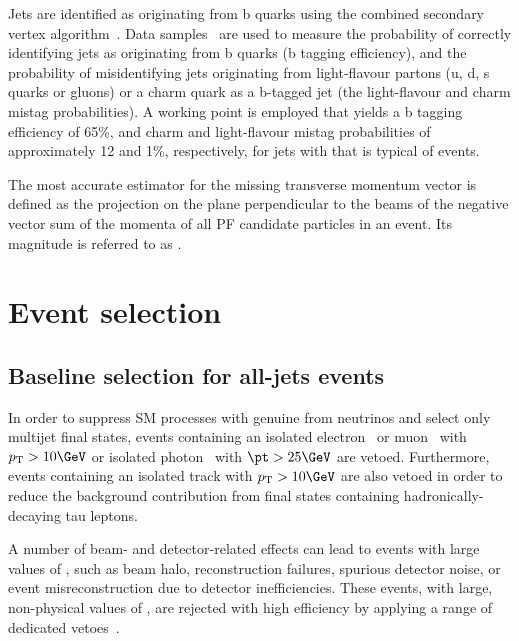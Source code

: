 Jets are identified as originating from b quarks using the combined
secondary vertex algorithm~\cite{CMS-PAS-BTV-12-001}. Data
samples~\cite{bjets} are used to measure the probability of correctly
identifying jets as originating from b quarks (b tagging efficiency),
and the probability of misidentifying jets originating from
light-flavour partons (u, d, s quarks or gluons) or a charm quark as a
b-tagged jet (the light-flavour and charm mistag probabilities). A
working point is employed that yields a b tagging efficiency of 65\%,
and charm and light-flavour mistag probabilities of approximately 12
and 1\%, respectively, for jets with \pt that is typical of \ttbar
events.

The most accurate estimator for the missing transverse momentum vector
\ptvecmiss is defined as the projection on the plane perpendicular to
the beams of the negative vector sum of the momenta of all PF
candidate particles in an event. Its magnitude is referred to as
\met.


\section{Event selection}
\label{sec:selection}

\subsection{Baseline selection for all-jets events}

In order to suppress SM processes with genuine \ptvecmiss from
neutrinos and select only multijet final states, events containing an
isolated electron~\cite{PAS-EGM-10-004} or muon~\cite{PAS-MUO-10-004}
with $\Pt > 10\GeV$ or isolated photon~\cite{PAS-EGM-10-006} with $\pt
> 25\GeV$ are vetoed. Furthermore, events containing an isolated track
with $\Pt > 10\GeV$ are also vetoed in order to reduce the background
contribution from final states containing hadronically-decaying tau
leptons. 

A number of beam- and detector-related effects can lead to events with
large values of \met, such as beam halo, reconstruction failures, 
spurious detector noise, or event misreconstruction due to detector
inefficiencies. These events, with large, non-physical values of \met,
are rejected with high efficiency by applying a range of dedicated
vetoes~\cite{RA1Paper2012, cms-met}.

